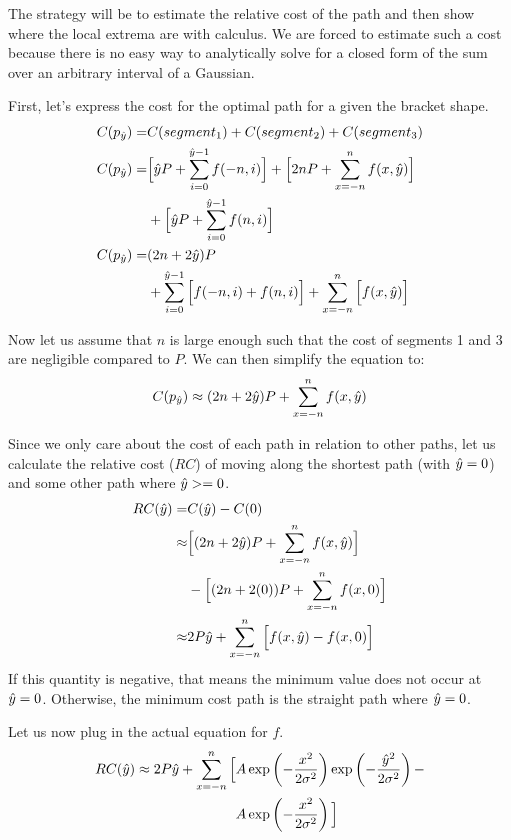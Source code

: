 The strategy will be to estimate the relative cost of the path and then show where the local extrema are with calculus. We are forced to estimate such a cost because there is no easy way to analytically solve for a closed form of the sum over an arbitrary interval of a Gaussian. 

First, let's express the cost for the optimal path for a given the bracket shape. 
\begin{align*}
C(p_{\hat{y}}) =&C(segment_1) + C(segment_2) + C(segment_3) \\
C(p_{\hat{y}}) =&\Big[\hat{y} P + \sum\limits_{i=0}^{\hat{y}-1} f(-n, i) \Big] +
         \Big[2nP + \sum\limits_{x=-n}^{n}    f(x,\hat{y}) \Big]\\
     &+\Big[\hat{y} P + \sum\limits_{i=0}^{\hat{y}-1} f(n, i) \Big] \\
C(p_{\hat{y}}) =&(2n+2\hat{y})P \\ &+\sum\limits_{i=0}^{\hat{y}-1} \Big[ f(-n, i) + f(n, i) \Big] + \sum\limits_{x=-n}^{n} \Big[f(x,\hat{y}) \Big]
\end{align*}

Now let us assume that $n$ is large enough such that the cost of segments 1 and 3 are negligible compared to $P$. We can then simplify the equation to:
\[
C(p_{\hat{y}}) \approx (2n+2\hat{y})P +  \sum\limits_{x=-n}^{n} f(x,\hat{y})
\]

Since we only care about the cost of each path in relation to other paths, let us calculate the relative cost ($RC$) of moving along the shortest path (with $\hat{y}=0$) and some other path where $\hat{y}>=0$. 
\begin{align*}
RC(\hat{y}) =& C(\hat{y})-C(0) \\
\approx& \Big[(2n+2\hat{y})P +  \sum\limits_{x=-n}^{n} f(x,\hat{y}) \Big] \\
 & - \Big[(2n+2(0))P +  \sum\limits_{x=-n}^{n} f(x,0) \Big] \\
\approx& 2P\hat{y} + \sum\limits_{x=-n}^{n} \Big[ f(x,\hat{y})-f(x,0) \Big]
\end{align*}
If this quantity is negative, that means the minimum value does not occur at $\hat{y}=0$. Otherwise, the minimum cost path is the straight path where $\hat{y}=0$.

Let us now plug in the actual equation for $f$. 
\begin{align*}
RC(\hat{y}) \approx 2P\hat{y} + \sum\limits_{x=-n}^{n} \Big[ &A\exp\left(-\frac{x^2}{2\sigma^2}\right)\exp\left(-\frac{\hat{y}^2}{2\sigma^2}\right) -\\
                                                           &A\exp\left(-\frac{x^2}{2\sigma^2}\right) \Big] 
\end{align*}

